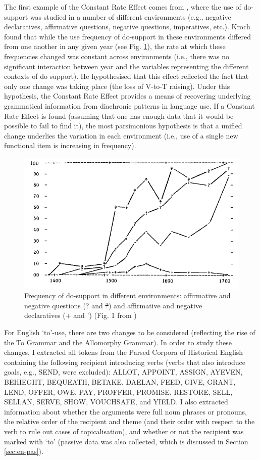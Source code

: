 	The first example of the Constant Rate Effect comes from \cite{Kroch.1989}, where the use of do-support was studied in a number of different environments (e.g., negative declaratives, affirmative questions, negative questions, imperatives, etc.). Kroch found that while the use frequency of do-support in these environments differed from one another in any given year (see Fig. \ref{fig:kroch-graph}), the rate at which these frequencies changed was constant across environments (i.e., there was no significant interaction between year and the variables representing the different contexts of do support). He hypothesised that this effect reflected the fact that only one change was taking place (the loss of V-to-T raising). Under this hypothesis, the Constant Rate Effect provides a means of recovering underlying grammatical information from diachronic patterns in language use. If a Constant Rate Effect is found (assuming that one has enough data that it would be possible to fail to find it), the most parsimonious hypothesis is that a unified change underlies the variation in each environment (i.e., use of a single new functional item is increasing in frequency).

	\begin{figure}[ht!]
		\includegraphics[width=.5\linewidth]{../images/kroch-graph}
		\caption{Frequency of do-support in different environments: affirmative and negative questions (? and \sout{?}) and affirmative and negative declaratives (+ and ') (Fig. 1 from \citealt{Kroch.1989})}
		\label{fig:kroch-graph}
	\end{figure}

	For English `to'-use, there are two changes to be considered (reflecting the rise of the To Grammar and the Allomorphy Grammar). In order to study these changes, I extracted all tokens from the Parsed Corpora of Historical English \citep{Kroch.2000,Taylor.2003,Kroch.2004,Taylor.2006,Kroch.2010} containing the following recipient introducing verbs (verbs that also introduce goals, e.g., SEND, were excluded): ALLOT, APPOINT, ASSIGN, AYEVEN, BEHIEGHT, BEQUEATH, BETAKE, DAELAN, FEED, GIVE, GRANT, LEND, OFFER, OWE, PAY, PROFFER, PROMISE, RESTORE, SELL, SELLAN, SERVE, SHOW, VOUCHSAFE, and YIELD. I also extracted information about whether the arguments were full noun phrases or pronouns, the relative order of the recipient and theme (and their order with respect to the verb to rule out cases of topicalisation), and whether or not the recipient was marked with `to' (passive data was also collected, which is discussed in Section \ref{sec:en-pas}). 
	
